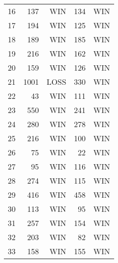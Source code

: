 \begin{tabular}{rrrrr}
        16 &        137 &        WIN &        134 &        WIN \\

        17 &        194 &        WIN &        125 &        WIN \\

        18 &        189 &        WIN &        185 &        WIN \\

        19 &        216 &        WIN &        162 &        WIN \\

        20 &        159 &        WIN &        126 &        WIN \\

        21 &       1001 &       LOSS &        330 &        WIN \\

        22 &         43 &        WIN &        111 &        WIN \\

        23 &        550 &        WIN &        241 &        WIN \\

        24 &        280 &        WIN &        278 &        WIN \\

        25 &        216 &        WIN &        100 &        WIN \\

        26 &         75 &        WIN &         22 &        WIN \\

        27 &         95 &        WIN &        116 &        WIN \\

        28 &        274 &        WIN &        115 &        WIN \\

        29 &        416 &        WIN &        458 &        WIN \\

        30 &        113 &        WIN &         95 &        WIN \\

        31 &        257 &        WIN &        154 &        WIN \\

        32 &        203 &        WIN &         82 &        WIN \\

        33 &        158 &        WIN &        155 &        WIN \\


\end{tabular}
